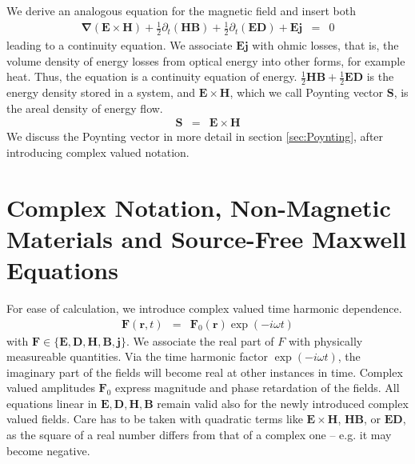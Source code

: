 \documentclass[12pt,a4paper,twoside,openright,BCOR10mm,headsepline,titlepage,abstracton,chapterprefix,final]{scrreprt}
\newcommand\Vector[1]{{\mathbf{#1}}}
\newcommand\Nabla{\Vector{\nabla}}
\newcommand\scalarEfield{E}
\newcommand\scalarBfield{B}
\newcommand\scalarHfield{H}
\newcommand\scalarDfield{D}
\newcommand\Efield{\Vector{\scalarEfield}}
\newcommand\Bfield{\Vector{\scalarBfield}}
\newcommand\Hfield{\Vector{\scalarHfield}}
\newcommand\Dfield{\Vector{\scalarDfield}}
\newcommand\currentdensity{\Vector{j}}
\begin{document}
We derive an analogous equation for the magnetic field and insert both
\begin{eqnarray}
   \Nabla ( \Efield \times \Hfield ) + \frac{1}{2} \partial_t (\Hfield \Bfield) + \frac{1}{2} \partial_t (\Efield \Dfield) + \Efield \currentdensity &=& 0
\end{eqnarray}
leading to a continuity equation. 
We associate $\Efield \currentdensity$ with ohmic losses, that is, the volume density of energy losses from optical energy into other forms, for example heat.
Thus, the equation is a continuity equation of energy.
$\frac{1}{2} \Hfield \Bfield + \frac{1}{2} \Efield \Dfield$ is the energy density stored in a system, 
and $\Efield \times \Hfield$, which we call Poynting vector $\Vector{S}$, is the areal density of energy flow.
\begin{eqnarray}
 \Vector{S} &=& \Efield \times \Hfield
 \label{eq:definitionOfPoynting}
\end{eqnarray}
We discuss the Poynting vector in more detail in section \ref{sec:Poynting}, after introducing complex valued notation.

\section{Complex Notation, Non-Magnetic Materials and Source-Free Maxwell Equations}
\label{sec:sourcefreemaxwell}
For ease of calculation, we introduce complex valued time harmonic dependence.
\begin{eqnarray}
 \Vector{F}(\Vector{r},t) &=& \Vector{F}_0(\Vector{r}) \exp(-i \omega t)
\end{eqnarray}
with $\Vector{F} \in \{ \Efield, \Dfield, \Hfield, \Bfield, \currentdensity \}$.
We associate the real part of $F$ with physically measureable quantities. 
Via the time harmonic factor $\exp(-i \omega t)$, the imaginary part of the fields will become real at other instances in time.
Complex valued amplitudes $\Vector{F}_0$ express magnitude and phase retardation of the fields.
All equations linear in $\Efield,\Dfield,\Hfield,\Bfield$ remain valid also for the newly introduced complex valued fields.
Care has to be taken with quadratic terms like $\Efield \times \Hfield$, $\Hfield \Bfield$, or $\Efield \Dfield$,
as the square of a real number differs from that of a complex one -- e.g. it may become negative.
\end{document}
